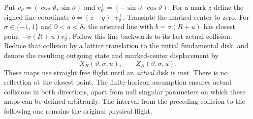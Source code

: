Put $v_\vartheta=(\cos\vartheta,\sin\vartheta)$ and
$v_\vartheta^\perp=(-\sin\vartheta,\cos\vartheta)$. For a mark $z$
define the signed line coordinate
$b=(z-q)\cdot v_\vartheta^\perp$. Translate the marked center to zero.
For $\sigma\in\{-1,1\}$ and $0<u<\delta_*$ the oriented line with
$b=\sigma(R+u)$ has closest point
$-\sigma(R+u)v_\vartheta^\perp$. Follow this line backwards to its
last actual collision. Reduce that collision by a lattice translation
to the initial fundamental disk, and denote the resulting outgoing
state and marked-center displacement by
\[
 X_R(\vartheta,\sigma,u),\qquad Z_R(\vartheta,\sigma,u).
\]
These maps use straight free flight until an \emph{actual} disk is
met. There is no reflection at the closest point. The finite-horizon
assumption ensures actual collisions in both directions, apart from
null singular parameters on which these maps can be defined
arbitrarily. The interval from the preceding collision to the following
one remains the original physical flight.

